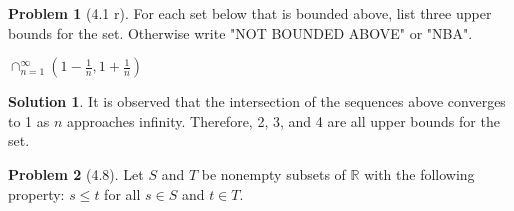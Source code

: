 \documentclass[12pt]{article}
\theoremstyle{definition} %
\newtheorem{solution}{Solution}
\newtheorem{problem}{Problem}
\theoremstyle{plain} %
\begin{document}
  
  \begin{problem}[4.1 r]
      
  For each set below that is bounded above, list three upper bounds for the set. Otherwise write "NOT BOUNDED ABOVE" or "NBA".
  
  $\cap_{n=1}^\infty\left( 1-\frac{1}{n}, 1+\frac{1}{n} \right)$ 
  
  \end{problem}
  \begin{solution}    
  It is observed that the intersection of the sequences above converges to 1 as $n$ approaches infinity. Therefore, 2, 3, and 4 are all upper bounds for the set.
  \end{solution}
  
  \begin{problem}[4.8]
   Let $S$ and $T$ be nonempty subsets of $\mathbb{R}$ with the following property:
  $s\leq t$ for all $s \in S$ and $t \in T$.
  
     
  \end{problem}
\end{document}
